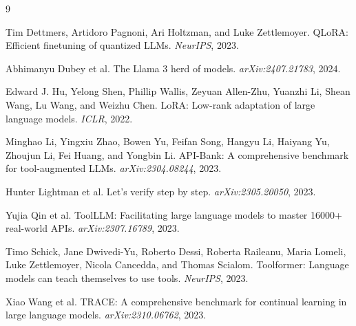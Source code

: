 \documentclass{article}
\begin{document}
\small

\begin{thebibliography}{9}

Tim Dettmers, Artidoro Pagnoni, Ari Holtzman, and Luke Zettlemoyer.
\newblock QLoRA: Efficient finetuning of quantized LLMs.
\newblock \emph{NeurIPS}, 2023.

Abhimanyu Dubey et al.
\newblock The Llama 3 herd of models.
\newblock \emph{arXiv:2407.21783}, 2024.

Edward J. Hu, Yelong Shen, Phillip Wallis, Zeyuan Allen-Zhu, Yuanzhi Li, Shean Wang, Lu Wang, and Weizhu Chen.
\newblock LoRA: Low-rank adaptation of large language models.
\newblock \emph{ICLR}, 2022.

Minghao Li, Yingxiu Zhao, Bowen Yu, Feifan Song, Hangyu Li, Haiyang Yu, Zhoujun Li, Fei Huang, and Yongbin Li.
\newblock API-Bank: A comprehensive benchmark for tool-augmented LLMs.
\newblock \emph{arXiv:2304.08244}, 2023.

Hunter Lightman et al.
\newblock Let's verify step by step.
\newblock \emph{arXiv:2305.20050}, 2023.

Yujia Qin et al.
\newblock ToolLLM: Facilitating large language models to master 16000+ real-world APIs.
\newblock \emph{arXiv:2307.16789}, 2023.

Timo Schick, Jane Dwivedi-Yu, Roberto Dessi, Roberta Raileanu, Maria Lomeli, Luke Zettlemoyer, Nicola Cancedda, and Thomas Scialom.
\newblock Toolformer: Language models can teach themselves to use tools.
\newblock \emph{NeurIPS}, 2023.

Xiao Wang et al.
\newblock TRACE: A comprehensive benchmark for continual learning in large language models.
\newblock \emph{arXiv:2310.06762}, 2023.

\end{thebibliography}
\end{document}
